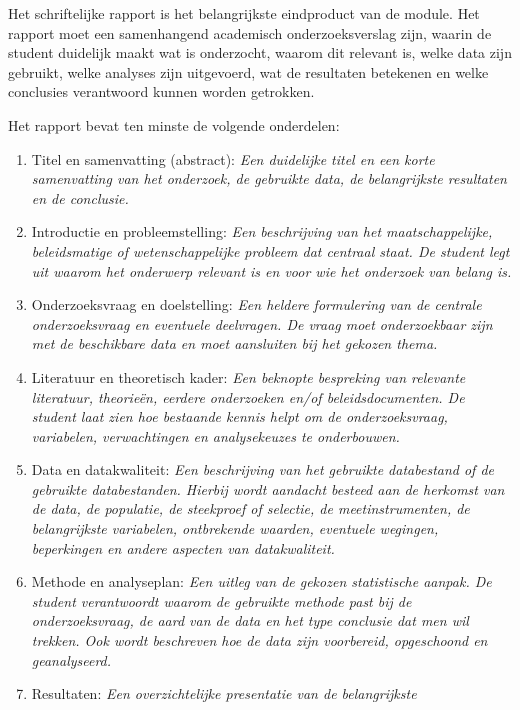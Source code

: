 \documentclass[
  letterpaper,
  DIV=11,
  numbers=noendperiod]{scrreprt}
\providecommand{\tightlist}{%
  \setlength{\itemsep}{0pt}\setlength{\parskip}{0pt}}
\begin{document}
Het schriftelijke rapport is het belangrijkste eindproduct van de
module. Het rapport moet een samenhangend academisch onderzoeksverslag
zijn, waarin de student duidelijk maakt wat is onderzocht, waarom dit
relevant is, welke data zijn gebruikt, welke analyses zijn uitgevoerd,
wat de resultaten betekenen en welke conclusies verantwoord kunnen
worden getrokken.

Het rapport bevat ten minste de volgende onderdelen:

\begin{enumerate}
\def\labelenumi{\arabic{enumi}.}
\tightlist
\item
  Titel en samenvatting (abstract): \emph{Een duidelijke titel en een
  korte samenvatting van het onderzoek, de gebruikte data, de
  belangrijkste resultaten en de conclusie.}
\item
  Introductie en probleemstelling: \emph{Een beschrijving van het
  maatschappelijke, beleidsmatige of wetenschappelijke probleem dat
  centraal staat. De student legt uit waarom het onderwerp relevant is
  en voor wie het onderzoek van belang is.}
\item
  Onderzoeksvraag en doelstelling: \emph{Een heldere formulering van de
  centrale onderzoeksvraag en eventuele deelvragen. De vraag moet
  onderzoekbaar zijn met de beschikbare data en moet aansluiten bij het
  gekozen thema.}
\item
  Literatuur en theoretisch kader: \emph{Een beknopte bespreking van
  relevante literatuur, theorieën, eerdere onderzoeken en/of
  beleidsdocumenten. De student laat zien hoe bestaande kennis helpt om
  de onderzoeksvraag, variabelen, verwachtingen en analysekeuzes te
  onderbouwen.}
\item
  Data en datakwaliteit: \emph{Een beschrijving van het gebruikte
  databestand of de gebruikte databestanden. Hierbij wordt aandacht
  besteed aan de herkomst van de data, de populatie, de steekproef of
  selectie, de meetinstrumenten, de belangrijkste variabelen,
  ontbrekende waarden, eventuele wegingen, beperkingen en andere
  aspecten van datakwaliteit.}
\item
  Methode en analyseplan: \emph{Een uitleg van de gekozen statistische
  aanpak. De student verantwoordt waarom de gebruikte methode past bij
  de onderzoeksvraag, de aard van de data en het type conclusie dat men
  wil trekken. Ook wordt beschreven hoe de data zijn voorbereid,
  opgeschoond en geanalyseerd.}
\item
  Resultaten: \emph{Een overzichtelijke presentatie van de belangrijkste
}
\end{enumerate}
\end{document}

